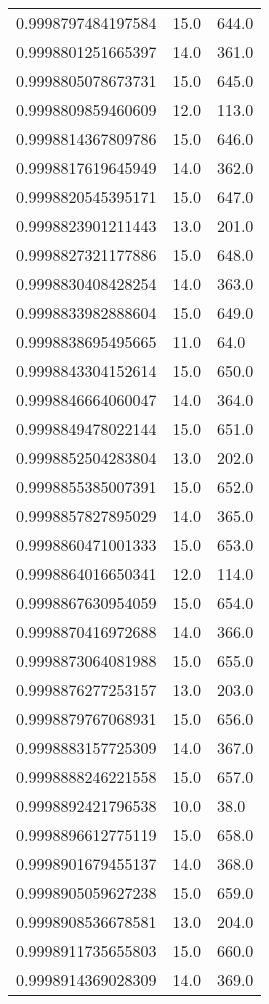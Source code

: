 \begin{center}
\begin{supertabular}[H]{p{0.30\textwidth}p{0.05\textwidth}p{0.05\textwidth}}
0.9998797484197584 & 15.0 & 644.0 \\ 
0.9998801251665397 & 14.0 & 361.0 \\ 
0.9998805078673731 & 15.0 & 645.0 \\ 
0.9998809859460609 & 12.0 & 113.0 \\ 
0.9998814367809786 & 15.0 & 646.0 \\ 
0.9998817619645949 & 14.0 & 362.0 \\ 
0.9998820545395171 & 15.0 & 647.0 \\ 
0.9998823901211443 & 13.0 & 201.0 \\ 
0.9998827321177886 & 15.0 & 648.0 \\ 
0.9998830408428254 & 14.0 & 363.0 \\ 
0.9998833982888604 & 15.0 & 649.0 \\ 
0.9998838695495665 & 11.0 & 64.0 \\ 
0.9998843304152614 & 15.0 & 650.0 \\ 
0.9998846664060047 & 14.0 & 364.0 \\ 
0.9998849478022144 & 15.0 & 651.0 \\ 
0.9998852504283804 & 13.0 & 202.0 \\ 
0.9998855385007391 & 15.0 & 652.0 \\ 
0.9998857827895029 & 14.0 & 365.0 \\ 
0.9998860471001333 & 15.0 & 653.0 \\ 
0.9998864016650341 & 12.0 & 114.0 \\ 
0.9998867630954059 & 15.0 & 654.0 \\ 
0.9998870416972688 & 14.0 & 366.0 \\ 
0.9998873064081988 & 15.0 & 655.0 \\ 
0.9998876277253157 & 13.0 & 203.0 \\ 
0.9998879767068931 & 15.0 & 656.0 \\ 
0.9998883157725309 & 14.0 & 367.0 \\ 
0.9998888246221558 & 15.0 & 657.0 \\ 
0.9998892421796538 & 10.0 & 38.0 \\ 
0.9998896612775119 & 15.0 & 658.0 \\ 
0.9998901679455137 & 14.0 & 368.0 \\ 
0.9998905059627238 & 15.0 & 659.0 \\ 
0.9998908536678581 & 13.0 & 204.0 \\ 
0.9998911735655803 & 15.0 & 660.0 \\ 
0.9998914369028309 & 14.0 & 369.0 \\ 

\end{supertabular}
\end{center}
